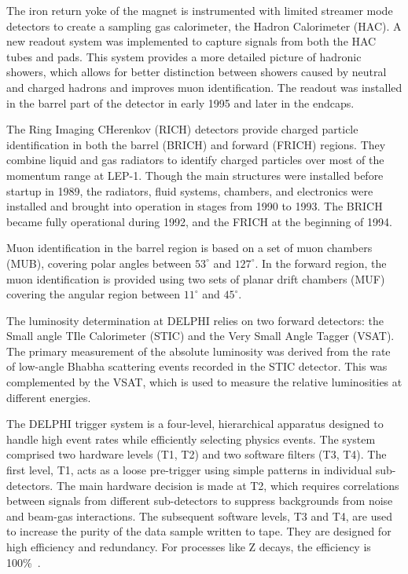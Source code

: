 \documentclass[a4paper,11pt]{article}
\begin{document}
The iron return yoke of the magnet is instrumented with limited streamer mode detectors to create a sampling gas calorimeter, the Hadron Calorimeter (HAC). A new readout system was implemented to capture signals from both the HAC tubes and pads. This system provides a more detailed picture of hadronic showers, which allows for better distinction between showers caused by neutral and charged hadrons and improves muon identification. The readout was installed in the barrel part of the detector in early 1995 and later in the endcaps.

The Ring Imaging CHerenkov (RICH) detectors provide charged particle identification in both the barrel (BRICH) and forward (FRICH) regions. They combine liquid and gas radiators to identify charged particles over most of the momentum range at LEP-1. Though the main structures were installed before startup in 1989, the radiators, fluid systems, chambers, and electronics were installed and brought into operation in stages from 1990 to 1993. The BRICH became fully operational during 1992, and the FRICH at the beginning of 1994.

Muon identification in the barrel region is based on a set of muon chambers (MUB), covering polar angles between $53^\circ$ and $127^\circ$. In the forward region, the muon identification is provided using two sets of planar drift chambers (MUF) covering the angular region between $11^\circ$ and $45^\circ$.


The luminosity determination at DELPHI relies on two forward detectors: the Small angle TIle Calorimeter (STIC) and the Very Small Angle Tagger (VSAT). The primary measurement of the absolute luminosity was derived from the rate of low-angle Bhabha scattering events recorded in the STIC detector. This was complemented by the VSAT, which is used to measure the relative luminosities at different energies. 

The DELPHI trigger system is a four-level, hierarchical apparatus designed to handle high event rates while efficiently selecting physics events. The system comprised two hardware levels (T1, T2) and two software filters (T3, T4). The first level, T1, acts as a loose pre-trigger using simple patterns in individual sub-detectors. The main hardware decision is made at T2, which requires correlations between signals from different sub-detectors to suppress backgrounds from noise and beam-gas interactions. 
The subsequent software levels, T3 and T4, are used to increase the purity of the data sample written to tape. They are designed for high efficiency and redundancy. For processes like Z decays, the efficiency is 100\%~\cite{DELPHITriggerGroup:1994vta}. 
\end{document}
